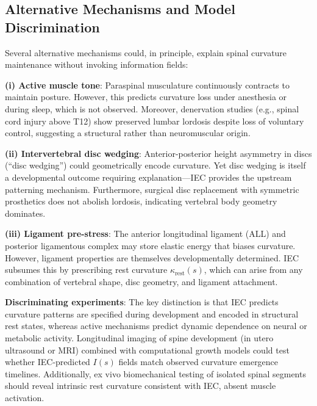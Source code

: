 \documentclass[11pt,a4paper]{article}
\begin{document}
\subsection{Alternative Mechanisms and Model Discrimination}
Several alternative mechanisms could, in principle, explain spinal curvature maintenance without invoking information fields:

\textbf{(i) Active muscle tone}: Paraspinal musculature continuously contracts to maintain posture. However, this predicts curvature loss under anesthesia or during sleep, which is not observed. Moreover, denervation studies (e.g., spinal cord injury above T12) show preserved lumbar lordosis despite loss of voluntary control, suggesting a structural rather than neuromuscular origin.

\textbf{(ii) Intervertebral disc wedging}: Anterior-posterior height asymmetry in discs (``disc wedging'') could geometrically encode curvature. Yet disc wedging is itself a developmental outcome requiring explanation—IEC provides the upstream patterning mechanism. Furthermore, surgical disc replacement with symmetric prosthetics does not abolish lordosis, indicating vertebral body geometry dominates.

\textbf{(iii) Ligament pre-stress}: The anterior longitudinal ligament (ALL) and posterior ligamentous complex may store elastic energy that biases curvature. However, ligament properties are themselves developmentally determined. IEC subsumes this by prescribing rest curvature $\kappa_{\mathrm{rest}}(s)$, which can arise from any combination of vertebral shape, disc geometry, and ligament attachment.

\textbf{Discriminating experiments}: The key distinction is that IEC predicts curvature patterns are specified during development and encoded in structural rest states, whereas active mechanisms predict dynamic dependence on neural or metabolic activity. Longitudinal imaging of spine development (in utero ultrasound or MRI) combined with computational growth models could test whether IEC-predicted $I(s)$ fields match observed curvature emergence timelines. Additionally, ex vivo biomechanical testing of isolated spinal segments should reveal intrinsic rest curvature consistent with IEC, absent muscle activation.
\end{document}
